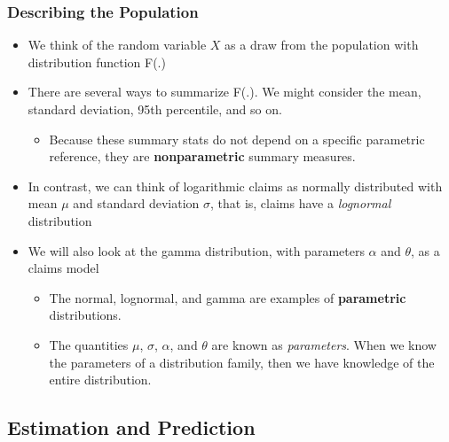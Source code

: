 \documentclass{beamer}
\begin{document}
\begin{frame}[shrink=2]
\frametitle{Describing the Population}
\begin{itemize}
\item We think of the random variable $X$ as a draw from the population with distribution function F(.)
\item There are several ways to summarize F(.). We might consider the mean, standard deviation, 95th percentile, and so on.
\begin{itemize}
\item Because these summary stats do not depend on a specific parametric reference, they are \textbf{nonparametric} summary measures.
\end{itemize}
\item In contrast, we can think of logarithmic claims as normally distributed with mean $\mu$ and standard deviation $\sigma$, that is, claims  have a \textit{lognormal} distribution
\item We will also look at the gamma distribution, with parameters $\alpha$ and $\theta$, as a claims model
\begin{itemize}
\item The normal, lognormal, and gamma are examples of \textbf{parametric} distributions.
\item The quantities $\mu$, $\sigma$, $\alpha$, and $\theta$ are known as \textit{parameters}. When we know the parameters of a distribution family, then we have knowledge of the entire distribution.
\end{itemize}
\end{itemize}
\end{frame}

\subsection{Estimation and Prediction}
\end{document}

